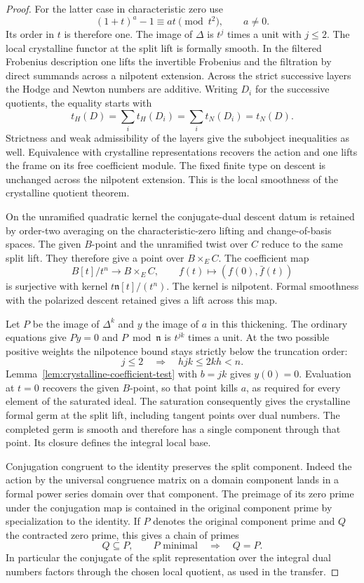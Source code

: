 \begin{proof}
For the latter case in characteristic zero use
\[
 (1+t)^a-1\equiv at\pmod{t^2},\qquad a\ne0 .
\]
Its order in \(t\) is therefore one. The image of \(\Delta\)
is \(t^j\) times a unit with \(j\le2\).
The local crystalline functor at the split
lift is formally smooth. In the filtered
Frobenius description one lifts the invertible
Frobenius and the filtration by direct summands
across a nilpotent extension. Across the strict successive layers the Hodge and Newton numbers are additive. Writing \(D_i\) for the successive quotients, the equality starts with
\[
 t_H(D)=\sum_i t_H(D_i)=\sum_i t_N(D_i)=t_N(D).
\]
Strictness and weak admissibility of the layers give the subobject inequalities as well. Equivalence with
crystalline representations recovers the action
and one lifts the frame on its free coefficient
module. The fixed finite type on descent
is unchanged across the nilpotent extension.
This is the local smoothness of the crystalline
quotient theorem.

On the unramified
quadratic kernel the conjugate-dual descent
datum is retained by order-two averaging
on the characteristic-zero lifting and
change-of-basis spaces. The given \(B\)-point and the unramified twist over
\(C\) reduce to the same split lift. They therefore give
a point over \(B\times_E C\). The coefficient map
\[
       B[t]/t^n\longrightarrow B\times_E C,\qquad
             f(t)\longmapsto (f(0),\bar f(t))
\]
is surjective with kernel \(t\mathfrak n[t]/(t^n)\).
The kernel is nilpotent. Formal smoothness with the
polarized descent retained gives a lift across this map.

Let \(P\) be the image of \(\Delta^k\)
and \(y\) the image of \(a\) in this
thickening. The ordinary equations give
\(Py=0\) and \(P\bmod\mathfrak n\) is
\(t^{jk}\) times a unit. At the two possible positive weights the nilpotence bound stays strictly below the truncation order:
\[
 j\le2\quad\Longrightarrow\quad hjk\le2kh<n .
\] Lemma~\ref{lem:crystalline-coefficient-test} with \(b=jk\) gives \(y(0)=0\). Evaluation at \(t=0\) recovers the given \(B\)-point, so that point kills \(a\), as required for every element of the saturated ideal.
The saturation consequently gives the
crystalline formal germ at the split lift,
including tangent points over dual numbers.
The completed germ is smooth and therefore
has a single component through that point.
Its closure defines the integral local base.

Conjugation congruent to the identity preserves
the split component. Indeed the action by the
universal congruence matrix on a domain
component lands in a formal power series domain
over that component. The preimage of its zero
prime under the conjugation map is contained in
the original component prime by specialization
to the identity. If \(P\) denotes the original component prime and \(Q\) the contracted zero prime, this gives a chain of primes
\[
 Q\subseteq P,\qquad P\text{ minimal}\quad\Longrightarrow\quad Q=P .
\] In particular the conjugate of
the split representation over the integral
dual numbers factors through the chosen local
quotient, as used in the transfer.


\end{proof}
